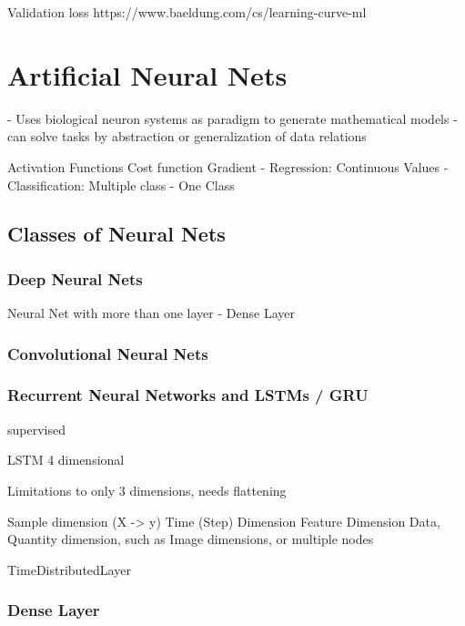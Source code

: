 Validation loss
https://www.baeldung.com/cs/learning-curve-ml

\section{Artificial Neural Nets}
\label{sec:artificial-neural-nets}

- Uses biological neuron systems as paradigm to generate mathematical models
- can solve tasks by abstraction or generalization of data relations


Activation Functions
Cost function
Gradient
- Regression: Continuous Values
- Classification: Multiple class
- One Class

\subsection{Classes of Neural Nets}
\label{subsec:classes-of-neural-nets}

\subsubsection{Deep Neural Nets}

Neural Net with more than one layer
- Dense Layer

\subsubsection{Convolutional Neural Nets}
\subsubsection{Recurrent Neural Networks and LSTMs / GRU}
supervised

LSTM 4 dimensional

Limitations to only 3 dimensions, needs flattening

Sample dimension (X -> y)
Time (Step) Dimension
Feature Dimension
Data, Quantity dimension, such as Image dimensions, or multiple nodes

TimeDistributedLayer

\subsubsection{Dense Layer}
\label{subsubsec:dense-layer}

